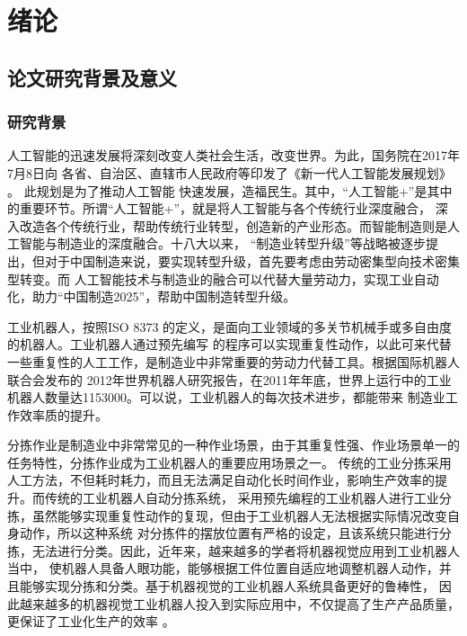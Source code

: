 \chapter{绪论}

\section{论文研究背景及意义}
\subsection{研究背景}

人工智能的迅速发展将深刻改变人类社会生活，改变世界。为此，国务院在2017年7月8日向
各省、自治区、直辖市人民政府等印发了《新一代人工智能发展规划》     \cite{GWY:2017}。
此规划是为了推动人工智能
快速发展，造福民生。其中，“人工智能+”是其中的重要环节。所谓“人工智能+”，就是将人工智能与各个传统行业深度融合，
深入改造各个传统行业，帮助传统行业转型，创造新的产业形态。而智能制造则是人工智能与制造业的深度融合。十八大以来，
“制造业转型升级”等战略被逐步提出，但对于中国制造来说，要实现转型升级，首先要考虑由劳动密集型向技术密集型转变。而
人工智能技术与制造业的融合可以代替大量劳动力，实现工业自动化，助力“中国制造2025”，帮助中国制造转型升级。

工业机器人，按照ISO 8373    \cite{ISO:1994}
的定义，是面向工业领域的多关节机械手或多自由度的机器人。工业机器人通过预先编写
的程序可以实现重复性动作，以此可来代替一些重复性的人工工作，是制造业中非常重要的劳动力代替工具。根据国际机器人联合会发布的
2012年世界机器人研究报告，在2011年年底，世界上运行中的工业机器人数量达1153000。可以说，工业机器人的每次技术进步，都能带来
制造业工作效率质的提升。

分拣作业是制造业中非常常见的一种作业场景，由于其重复性强、作业场景单一的任务特性，分拣作业成为工业机器人的重要应用场景之一。
传统的工业分拣采用人工方法，不但耗时耗力，而且无法满足自动化长时间作业，影响生产效率的提升。而传统的工业机器人自动分拣系统，
采用预先编程的工业机器人进行工业分拣，虽然能够实现重复性动作的复现，但由于工业机器人无法根据实际情况改变自身动作，所以这种系统
对分拣件的摆放位置有严格的设定，且该系统只能进行分拣，无法进行分类。因此，近年来，越来越多的学者将机器视觉应用到工业机器人当中，
使机器人具备人眼功能，能够根据工件位置自适应地调整机器人动作，并且能够实现分拣和分类。基于机器视觉的工业机器人系统具备更好的鲁棒性，
因此越来越多的机器视觉工业机器人投入到实际应用中，不仅提高了生产产品质量，更保证了工业化生产的效率  \cite{CJF:2011}。

